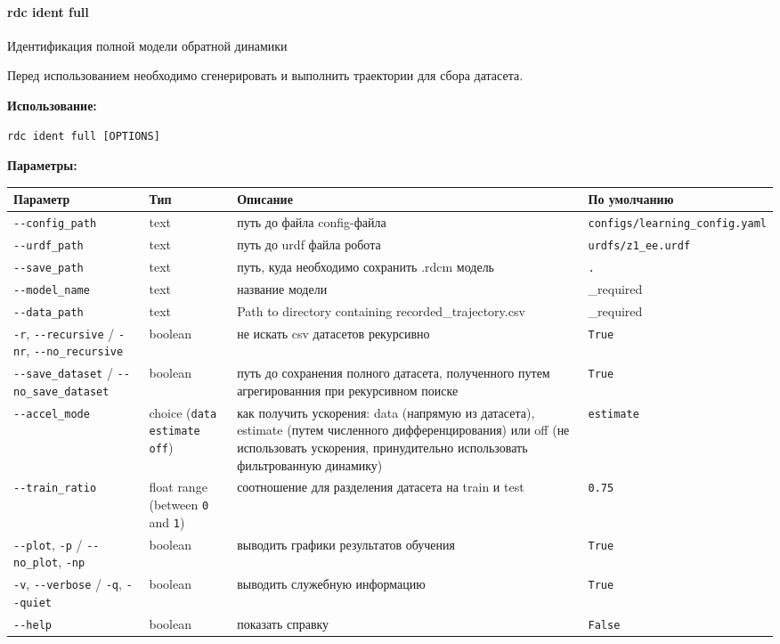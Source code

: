 \hypertarget{rdc-ident-full}{%
\paragraph{rdc ident full}\label{rdc-ident-full}}

Идентификация полной модели обратной динамики

Перед использованием необходимо сгенерировать и выполнить траектории для сбора датасета.

\textbf{Использование:}
\begin{lstlisting}[language=python, numbers=none, frame=single]
rdc ident full [OPTIONS]
\end{lstlisting}

\textbf{Параметры:}
\begin{center}
\fontsize{10pt}{10pt}\selectfont
\begin{longtable}[]{p{5cm}|p{2cm}|p{3.5cm}|p{5cm}}
    \hline
\toprule()
Параметр & Тип & Описание & По умолчанию \\
\hline
\midrule()
\endhead
\texttt{-\/-config\_path} & text & путь до файла config-файла &
\texttt{configs/learning\_config.yaml} \\
\hline
\texttt{-\/-urdf\_path} & text & путь до urdf файла робота &
\texttt{urdfs/z1\_ee.urdf} \\
\hline
\texttt{-\/-save\_path} & text & путь, куда необходимо сохранить .rdcm модель &
\texttt{.} \\
\hline
\texttt{-\/-model\_name} & text & название модели & \_required \\
\hline
\texttt{-\/-data\_path} & text & Path to directory containing
recorded\_trajectory.csv & \_required \\
\hline
\texttt{-r}, \texttt{-\/-recursive} / \texttt{-nr},
\texttt{-\/-no\_recursive} & boolean & не искать csv датасетов рекурсивно &
\texttt{True} \\
\hline
\texttt{-\/-save\_dataset} / \texttt{-\/-no\_save\_dataset} & boolean &
путь до сохранения полного датасета, полученного путем агрегированния при рекурсивном поиске& \texttt{True} \\
\hline
\texttt{-\/-accel\_mode} & choice (\texttt{data} \textbar{}
\texttt{estimate} \textbar{} \texttt{off}) & как получить ускорения: data (напрямую из датасета), estimate (путем численного дифференцирования) или off (не использовать ускорения, принудительно использовать фильтрованную динамику) & \texttt{estimate} \\
\hline
\texttt{-\/-train\_ratio} & float range (between \texttt{0} and
\texttt{1}) & соотношение для разделения датасета на train и test & \texttt{0.75} \\
\hline
\texttt{-\/-plot}, \texttt{-p} / \texttt{-\/-no\_plot}, \texttt{-np} &
boolean & выводить графики результатов обучения & \texttt{True} \\
\hline
\texttt{-v}, \texttt{-\/-verbose} / \texttt{-q}, \texttt{-\/-quiet} &
boolean & выводить служебную информацию & \texttt{True} \\
\hline
\texttt{-\/-help} & boolean & показать справку &
\texttt{False} \\
\bottomrule()
\hline
\end{longtable}
\end{center}

